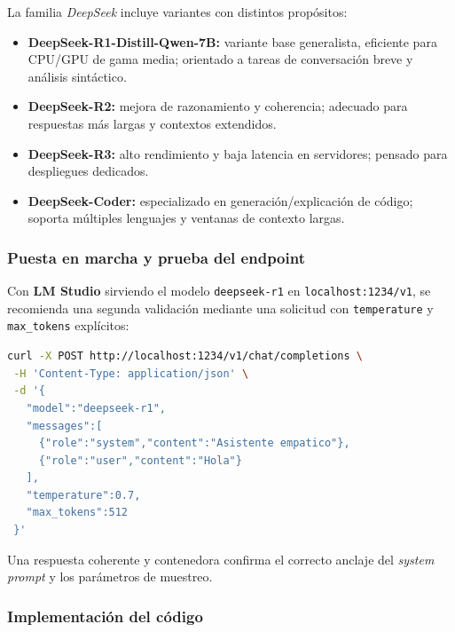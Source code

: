 \documentclass[12pt,a4paper]{report}
\numberwithin{figure}{section}
\begin{document}
La familia \textit{DeepSeek} incluye variantes con distintos propósitos:
\begin{itemize}
    \item \textbf{DeepSeek-R1-Distill-Qwen-7B:} variante base generalista, eficiente para CPU/GPU de gama media; orientado a tareas de conversación breve y análisis sintáctico.
    \item \textbf{DeepSeek-R2:} mejora de razonamiento y coherencia; adecuado para respuestas más largas y contextos extendidos.
    \item \textbf{DeepSeek-R3:} alto rendimiento y baja latencia en servidores; pensado para despliegues dedicados.
    \item \textbf{DeepSeek-Coder:} especializado en generación/explicación de código; soporta múltiples lenguajes y ventanas de contexto largas.
\end{itemize}

\vspace{1em}
\subsubsection{Puesta en marcha y prueba del endpoint}
\label{subsubsec:descarga_ejecución}

Con \textbf{LM Studio} sirviendo el modelo \texttt{deepseek-r1} en \texttt{localhost:1234/v1}, se recomienda una segunda validación mediante una solicitud con \texttt{temperature} y \texttt{max\_tokens} explícitos:

\begin{lstlisting}[style=angelcode,language=bash,caption={Smoke test con parámetros de generación}]
curl -X POST http://localhost:1234/v1/chat/completions \
 -H 'Content-Type: application/json' \
 -d '{
   "model":"deepseek-r1",
   "messages":[
     {"role":"system","content":"Asistente empatico"},
     {"role":"user","content":"Hola"}
   ],
   "temperature":0.7,
   "max_tokens":512
 }'
\end{lstlisting}

Una respuesta coherente y contenedora confirma el correcto anclaje del \textit{system prompt} y los parámetros de muestreo.

\vspace{1em}
\subsubsection{Implementación del código}
\label{subsubsec:implementacion_codigo}
\end{document}
